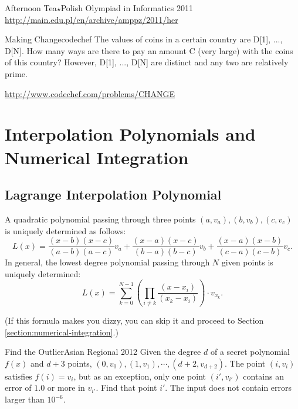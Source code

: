 \begin{versionbeta}
\begin{pbox}{Afternoon Tea$\star$}{Polish Olympiad in Informatics 2011}
\url{http://main.edu.pl/en/archive/amppz/2011/her}
\end{pbox}

\begin{pbox}{Making Change}{codechef}
The values of coins in a certain country are D[1], ..., D[N]. How many ways are there to pay an amount C (very large) with the coins of this country?
However, D[1], ..., D[N] are distinct and any two are relatively prime.

\url{http://www.codechef.com/problems/CHANGE}
\end{pbox}

\chapter{Interpolation Polynomials and Numerical Integration}\label{chapter:integral}

\section{Lagrange Interpolation Polynomial}

A quadratic polynomial passing through three points $(a,v_a), (b,v_b), (c, v_c)$ is uniquely determined as follows:
\begin{equation}
L(x) = \frac{(x-b)(x-c)}{(a-b)(a-c)}v_a + \frac{(x-a)(x-c)}{(b-a)(b-c)}v_b + \frac{(x-a)(x-b)}{(c-a)(c-b)}v_c. \label{eq:interpolate3}  
\end{equation}
In general, the lowest degree polynomial passing through $N$ given points is uniquely determined:
$$
L(x) = \sum_{k=0}^{N-1} \left(\prod_{i\neq k}\frac{(x-x_i)}{(x_k-x_i)}\right)\cdot{}v_{x_k}.
$$

(If this formula makes you dizzy, you can skip it and proceed to Section \ref{section:numerical-integration}.)

\begin{pbox}{Find the Outlier}{Asian Regional 2012}
Given the degree $d$ of a secret polynomial $f(x)$ and $d+3$ points, $(0,v_0), (1,v_1), \cdots,(d+2,v_{d+2})$.
The point $(i,v_i)$ satisfies $f(i)=v_i$, but as an exception,
only one point $(i',v_{i'})$ contains an error of $1.0$ or more in $v_{i'}$. Find that point $i'$. The input does not contain errors larger than $10^{-6}$.

\end{pbox}


\end{versionbeta}

